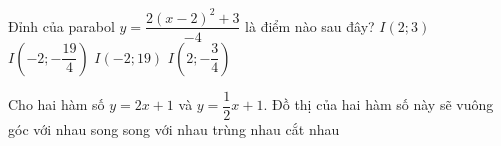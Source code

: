 \begin{ex}%
	Đỉnh của parabol $y=\dfrac{2(x-2)^2+3}{-4}$ là điểm nào sau đây?
	\choice
	{$I(2;3)$}
	{$I\left(-2;-\dfrac{19}{4}\right)$}
	{$I(-2;19)$}
	{\True $I\left(2;-\dfrac{3}{4}\right)$}
\end{ex}
\begin{ex}%
	Cho hai hàm số $y=2x+1$ và $y=\dfrac{1}{2}x+1$. Đồ thị của hai hàm số này sẽ
	\choice
	{vuông góc với nhau}
	{song song với nhau}
	{trùng nhau}
	{\True cắt nhau}
\end{ex}

